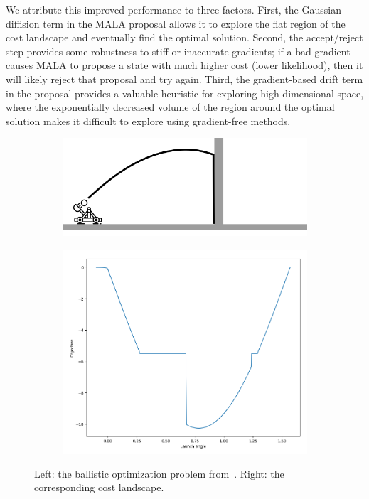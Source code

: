 We attribute this improved performance to three factors. First, the Gaussian diffision term in the MALA proposal allows it to explore the flat region of the cost landscape and eventually find the optimal solution. Second, the accept/reject step provides some robustness to stiff or inaccurate gradients; if a bad gradient causes MALA to propose a state with much higher cost (lower likelihood), then it will likely reject that proposal and try again. Third, the gradient-based drift term in the proposal provides a valuable heuristic for exploring high-dimensional space, where the exponentially decreased volume of the region around the optimal solution makes it difficult to explore using gradient-free methods.

\begin{figure}[t]
    \centering
    \begin{subfigure}[t]{0.6\linewidth}
        \centering
        \includegraphics[width=\linewidth]{images/global_methods/ballistic.png}
    \end{subfigure}
    \begin{subfigure}[t]{0.3\linewidth}
        \centering
        \includegraphics[width=\linewidth]{images/global_methods/ballistic_cost.png}
    \end{subfigure}%
    \caption{Left: the ballistic optimization problem from~\cite{suhDifferentiableSimulatorsGive2022}. Right: the corresponding cost landscape.}
    \label{global:fig:ballistic}
\end{figure}

